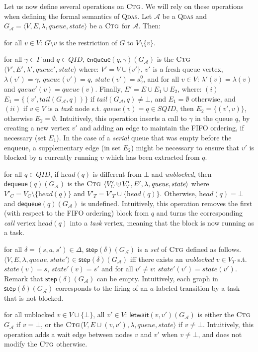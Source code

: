 \documentclass[runningheads,oribibl,]{article}
\newcommand{\tuple}[1]{\langle#1\rangle\xspace}
\newcommand{\Aa}{\ensuremath{\mathcal{A}}\xspace}
\DeclareMathOperator{\dotcup}{\mathaccent\cdot\cup}
\newcommand{\SQID}{SQID\xspace}
\newcommand{\QID}{QID\xspace}
\newcommand{\qdas}{\textsc{Qdas}\xspace}
\newcommand{\Graph}{\ensuremath{G}}
\newcommand{\queue}{\ensuremath{\textit{queue}}}
\newcommand{\state}{\ensuremath{\textit{state}}}
\newcommand{\head}{\ensuremath{\textit{head}}}
\newcommand{\tail}{\ensuremath{\textit{tail}}}
\newcommand{\enqueue}{\ensuremath{\textsf{enqueue}}}
\newcommand{\dequeue}{\ensuremath{\textsf{dequeue}}}
\newcommand{\step}{\ensuremath{\textsf{step}}}
\newcommand{\letwait}{\ensuremath{\textsf{letwait}}}
\newcommand{\ctg}{\ensuremath{\textsc{Ctg}}\xspace}
\newenvironment{myitemize}{\begin{list}{\labelitemi}{\setlength{\topsep}{4pt}\setlength{\partopsep}{0pt}
\setlength{\itemsep}{0pt}
\setlength{\itemindent}{0ex}
\setlength{\listparindent}{0ex}
\setlength{\leftmargin}{4ex}\setlength{\labelwidth}{2ex}
}}
{\end{list}}
\begin{document}
Let us now define several operations on \ctg. We will rely on these
operations when defining the formal semantics of \qdas. Let $\Aa$ be a
\qdas and $\Graph_\Aa=\tuple{V,E,\lambda,\allowbreak \queue,\state}$
be a \ctg for $\Aa$. Then:
\begin{myitemize}
\item for all $v\in V$: $\Graph\setminus v$ is the restriction of
  $\Graph$ to $V\setminus\{v\}$.
\item for all $\gamma\in\Gamma$ and $q\in\QID$,
  $\enqueue(q,\gamma)(\Graph_\Aa)$ is the \ctg $\tuple{V', E',
    \lambda', \queue', \state}$ where: $V'=V\cup\{v'\}$, $v'$ is a
  fresh queue vertex, $\lambda(v')=\gamma$, $\queue(v')=q$,
  $\state(v')=s^0_\gamma$, and for all $v\in V$:
  $\lambda'(v)=\lambda(v)$ and $\queue'(v)=\queue(v)$.  Finally,
  $E'=E\cup E_1\cup E_2$, where: $(i)$
  $E_1=\{(v',\tail(\Graph_\Aa,q))\}$ if
  $\tail(\Graph_\Aa,q)\neq\bot$,
  and $E_1=\emptyset$ otherwise, and $(ii)$ if $v\in V$ is a
  \emph{task} node s.t. $\queue(v)=q\in\SQID$, then $E_2=\{(v',v)\}$,
  otherwise $E_2=\emptyset$. Intuitively, this operation inserts a
  call to $\gamma$ in the queue $q$, by creating a new vertex $v'$ and
  adding an edge to maintain the FIFO ordering, if necessary (set
  $E_1$). In the case of a \emph{serial} queue that was empty before
  the enqueue, a supplementary edge (in set $E_2$) might be necessary
  to ensure that $v'$ is blocked by a currently running $v$ which has
  been extracted from $q$.
\item for all $q\in\QID$, if $\head(q)$ is different from $\bot$ and
  \emph{unblocked}, then $\dequeue(q)(\Graph_\Aa)$ is the \ctg
  $\tuple{V_C'\dotcup V'_T, E', \lambda, \queue, \state}$ where
  $V'_C=V_C\setminus\{\head(q)\}$ and
  $V'_T=V'_T\cup\{\head(q)\}$. Otherwise, $\head(q)=\bot$ and
  $\dequeue(q)(\Graph_\Aa)$ is undefined. Intuitively, this operation
  removes the first (with respect to the FIFO ordering) block from $q$
  and turns the corresponding \emph{call} vertex $\head(q)$ into a
  \emph{task} vertex, meaning that the block is now running as a
  task.\item for all $\delta=(s,a,s')\in\Delta$, $\step(\delta)(\Graph_\Aa)$
  is a \emph{set} of \ctg defined as follows. $\tuple{V, E, \lambda,
    \queue, \state'}\in\step(\delta)(\Graph_\Aa)$ iff there exists an
  \emph{unblocked} $v\in V_T$ s.t. $\state(v)=s$, $\state'(v)=s'$ and
  for all $v'\neq v$: $\state'(v')=\state(v')$. Remark that
  $\step(\delta)(\Graph_\Aa)$ can be empty. Intuitively, each graph in
  $\step(\delta)(\Graph_\Aa)$ corresponds to the firing of an
  $a$-labeled transition by a task that is not blocked.
\item for all unblocked $v\in V\cup\{\bot\}$, all $v'\in V$:
  $\letwait(v,v')(\Graph_\Aa)$ is either the \ctg $\Graph_\Aa$ if
  $v=\bot$, or the \ctg $\tuple{V, E\cup (v,v'),\lambda, \queue,
    \state}$ if $v\neq \bot$. Intuitively, this operation adds a wait
  edge between nodes $v$ and $v'$ when $v\neq\bot$, and does not
  modify the \ctg otherwise.
\end{myitemize}
\end{document}
